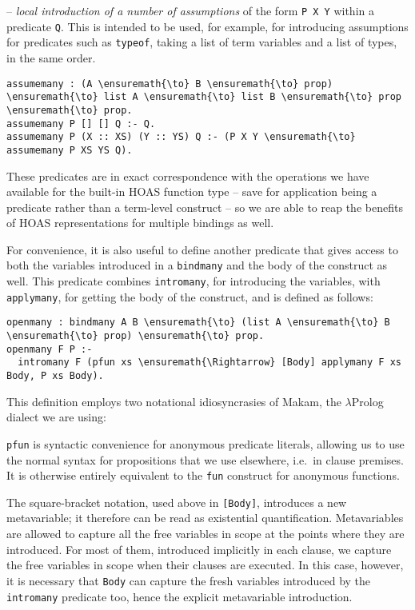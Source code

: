 -- \emph{local introduction of a number of assumptions} of the form
\texttt{P\ X\ Y} within a predicate \texttt{Q}. This is intended to be
used, for example, for introducing assumptions for predicates such as
\texttt{typeof}, taking a list of term variables and a list of types, in
the same order.

\begin{verbatim}
assumemany : (A \ensuremath{\to} B \ensuremath{\to} prop) \ensuremath{\to} list A \ensuremath{\to} list B \ensuremath{\to} prop \ensuremath{\to} prop.
assumemany P [] [] Q :- Q.
assumemany P (X :: XS) (Y :: YS) Q :- (P X Y \ensuremath{\to} assumemany P XS YS Q).
\end{verbatim}

These predicates are in exact correspondence with the operations we have
available for the built-in HOAS function type -- save for application
being a predicate rather than a term-level construct -- so we are able
to reap the benefits of HOAS representations for multiple bindings as
well.

For convenience, it is also useful to define another predicate that
gives access to both the variables introduced in a \texttt{bindmany} and
the body of the construct as well. This predicate combines
\texttt{intromany}, for introducing the variables, with
\texttt{applymany}, for getting the body of the construct, and is
defined as follows:

\begin{verbatim}
openmany : bindmany A B \ensuremath{\to} (list A \ensuremath{\to} B \ensuremath{\to} prop) \ensuremath{\to} prop.
openmany F P :-
  intromany F (pfun xs \ensuremath{\Rightarrow} [Body] applymany F xs Body, P xs Body).
\end{verbatim}

This definition employs two notational idiosyncrasies of Makam, the
\ensuremath{\lambda}Prolog dialect we are using:

\texttt{pfun} is syntactic convenience for anonymous predicate literals,
allowing us to use the normal syntax for propositions that we use
elsewhere, i.e.~in clause premises. It is otherwise entirely equivalent
to the \texttt{fun} construct for anonymous functions.

The square-bracket notation, used above in \texttt{{[}Body{]}},
introduces a new metavariable; it therefore can be read as existential
quantification. Metavariables are allowed to capture all the free
variables in scope at the points where they are introduced. For most of
them, introduced implicitly in each clause, we capture the free
variables in scope when their clauses are executed. In this case,
however, it is necessary that \texttt{Body} can capture the fresh
variables introduced by the \texttt{intromany} predicate too, hence the
explicit metavariable introduction.

